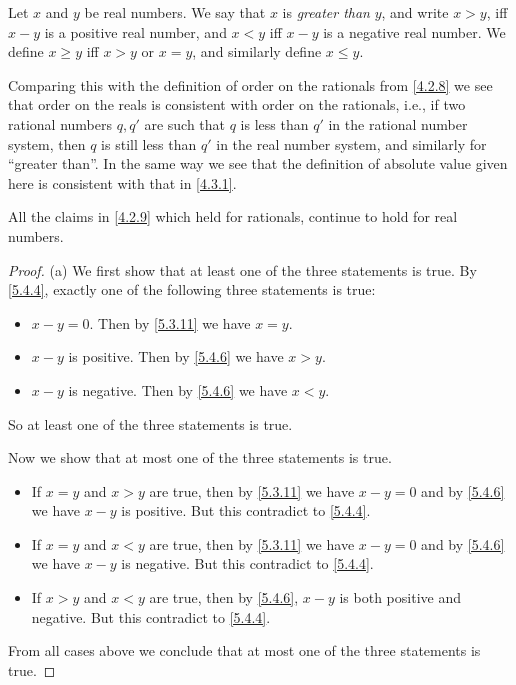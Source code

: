 \begin{defn}\label{5.4.6}
  Let \(x\) and \(y\) be real numbers.
  We say that \(x\) is \emph{greater than} \(y\), and write \(x > y\), iff \(x - y\) is a positive real number, and \(x < y\) iff \(x - y\) is a negative real number.
  We define \(x \geq y\) iff \(x > y\) or \(x = y\), and similarly define \(x \leq y\).
\end{defn}

\begin{note}
  Comparing this with the definition of order on the rationals from \cref{4.2.8} we see that order on the reals is consistent with order on the rationals, i.e., if two rational numbers \(q, q'\) are such that \(q\) is less than \(q'\) in the rational number system, then \(q\) is still less than \(q'\) in the real number system, and similarly for ``greater than''.
  In the same way we see that the definition of absolute value given here is consistent with that in \cref{4.3.1}.
\end{note}

\begin{prop}\label{5.4.7}
  All the claims in \cref{4.2.9} which held for rationals, continue to hold for real numbers.
\end{prop}

\begin{proof}{(a)}
  We first show that at least one of the three statements is true.
  By \cref{5.4.4}, exactly one of the following three statements is true:
  \begin{itemize}
    \item \(x - y = 0\).
          Then by \cref{5.3.11} we have \(x = y\).
    \item \(x - y\) is positive.
          Then by \cref{5.4.6} we have \(x > y\).
    \item \(x - y\) is negative.
          Then by \cref{5.4.6} we have \(x < y\).
  \end{itemize}
  So at least one of the three statements is true.

  Now we show that at most one of the three statements is true.
  \begin{itemize}
    \item If \(x = y\) and \(x > y\) are true, then by \cref{5.3.11} we have \(x - y = 0\) and by \cref{5.4.6} we have \(x - y\) is positive.
          But this contradict to \cref{5.4.4}.
    \item If \(x = y\) and \(x < y\) are true, then by \cref{5.3.11} we have \(x - y = 0\) and by \cref{5.4.6} we have \(x - y\) is negative.
          But this contradict to \cref{5.4.4}.
    \item If \(x > y\) and \(x < y\) are true, then by \cref{5.4.6}, \(x - y\) is both positive and negative.
          But this contradict to \cref{5.4.4}.
  \end{itemize}
  From all cases above we conclude that at most one of the three statements is true.
\end{proof}

